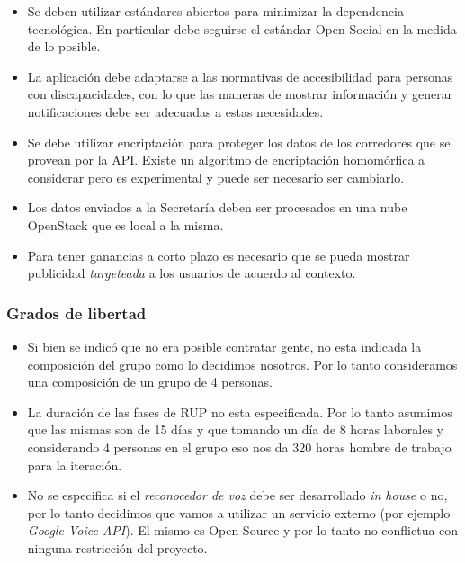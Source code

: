 \begin{itemize}
\itemsep1pt\parskip0pt
\item
  Se deben utilizar estándares abiertos para minimizar la dependencia
  tecnológica. En particular debe seguirse el estándar Open Social en la
  medida de lo posible.
\item
  La aplicación debe adaptarse a las normativas de accesibilidad para
  personas con discapacidades, con lo que las maneras de mostrar
  información y generar notificaciones debe ser adecuadas a estas
  necesidades.
\item
  Se debe utilizar encriptación para proteger los datos de los
  corredores que se provean por la API. Existe un algoritmo de
  encriptación homomórfica a considerar pero es experimental y puede ser
  necesario ser cambiarlo.
\item
  Los datos enviados a la Secretaría deben ser procesados en una nube
  OpenStack que es local a la misma.
\item
  Para tener ganancias a corto plazo es necesario que se pueda mostrar
  publicidad \emph{targeteada} a los usuarios de acuerdo al contexto.
\end{itemize}

\subsubsection{Grados de libertad}

\begin{itemize}
\itemsep1pt\parskip0pt
\item
  Si bien se indicó que no era posible contratar gente, no esta indicada
  la composición del grupo como lo decidimos nosotros. Por lo tanto
  consideramos una composición de un grupo de 4 personas.
\item
  La duración de las fases de RUP no esta especificada. Por lo tanto
  asumimos que las mismas son de 15 días y que tomando un día de 8 horas
  laborales y considerando 4 personas en el grupo eso nos da 320 horas
  hombre de trabajo para la iteración.
\item
  No se especifica si el \emph{reconocedor de voz} debe ser desarrollado
  \emph{in house} o no, por lo tanto decidimos que vamos a utilizar un
  servicio externo (por ejemplo \emph{Google Voice API}). El mismo es
  Open Source y por lo tanto no conflictua con ninguna restricción del
  proyecto.
\end{itemize}
